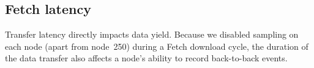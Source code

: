 



\subsection{Fetch latency}

Transfer latency directly impacts data yield. Because we disabled sampling on
each node (apart from node~250) during a Fetch download cycle, 
the duration of the data transfer also affects a node's ability to 
record back-to-back events.  

